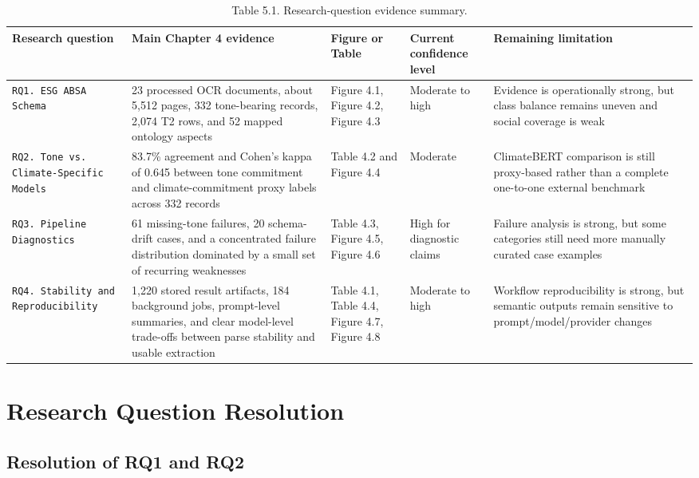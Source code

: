 \begin{table}[htbp]
\centering
\caption{Table 5.1. Research-question evidence summary.}
\label{tab:research-question-evidence-summary}
\footnotesize
\setlength{\tabcolsep}{4pt}
\renewcommand{\arraystretch}{1.15}
\begin{tabularx}{\linewidth}{|p{2cm}|X|p{2cm}|p{2cm}|X|}
\hline
\textbf{Research question} & \textbf{Main Chapter 4 evidence} & \textbf{Figure or Table} & \textbf{Current confidence level} & \textbf{Remaining limitation} \\ \hline
\texttt{RQ1. ESG ABSA Schema} & 23 processed OCR documents, about 5,512 pages, 332 tone-bearing records, 2,074 T2 rows, and 52 mapped ontology aspects & Figure 4.1, Figure 4.2, Figure 4.3 & Moderate to high & Evidence is operationally strong, but class balance remains uneven and social coverage is weak \\ \hline
\texttt{RQ2. Tone vs. Climate-Specific Models} & 83.7\% agreement and Cohen's kappa of 0.645 between tone commitment and climate-commitment proxy labels across 332 records & Table 4.2 and Figure 4.4 & Moderate & ClimateBERT comparison is still proxy-based rather than a complete one-to-one external benchmark \\ \hline
\texttt{RQ3. Pipeline Diagnostics} & 61 missing-tone failures, 20 schema-drift cases, and a concentrated failure distribution dominated by a small set of recurring weaknesses & Table 4.3, Figure 4.5, Figure 4.6 & High for diagnostic claims & Failure analysis is strong, but some categories still need more manually curated case examples \\ \hline
\texttt{RQ4. Stability and Reproducibility} & 1,220 stored result artifacts, 184 background jobs, prompt-level summaries, and clear model-level trade-offs between parse stability and usable extraction & Table 4.1, Table 4.4, Figure 4.7, Figure 4.8 & Moderate to high & Workflow reproducibility is strong, but semantic outputs remain sensitive to prompt/model/provider changes \\ \hline
\end{tabularx}
\end{table}

\section{Research Question Resolution}

\subsection{Resolution of RQ1 and RQ2}

